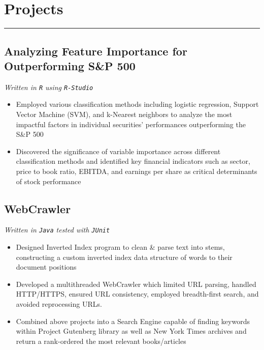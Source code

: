 \documentclass[11pt,a4paper]{article}
\newenvironment{myitemize}
{ \begin{itemize}[label={--}, leftmargin=*]
    \setlength{\itemsep}{0pt}
    \setlength{\parskip}{0pt}
    \setlength{\parsep}{0pt}     }
{ \end{itemize}                  }
\begin{document}
\section*{Projects}
\vspace{-3mm} %
\hrule
\vspace{3mm} %

\subsection*{Analyzing Feature Importance for Outperforming S\&P 500 \hfill {} }
\vspace{-1.5mm} %
\textit{Written in \texttt{R} using \texttt{R-Studio}}
\vspace{-1.5mm} %
\begin{myitemize}
\item Employed various classification methods including logistic regression, Support Vector Machine (SVM), and k-Nearest neighbors to analyze the most impactful factors in individual securities' performances outperforming the S\&P 500
\item Discovered the significance of variable importance across different classification methods and identified key financial indicators such as sector, price to book ratio, EBITDA, and earnings per share as critical determinants of stock performance
\end{myitemize}

\subsection*{WebCrawler \hfill {} }
\vspace{-1.5mm} %
\textit{Written in \texttt{Java} tested with \texttt{JUnit}}
\vspace{-1.5mm} %
\begin{myitemize}
\item Designed Inverted Index program to clean \& parse text into stems, constructing a custom inverted index data structure of words to their document positions
\item Developed a multithreaded WebCrawler which limited URL parsing, handled HTTP/HTTPS, ensured URL consistency, employed breadth-first search, and avoided reprocessing URLs. 
\item Combined above projects into a Search Engine capable of finding keywords within Project Gutenberg library as well as New York Times archives and return a rank-ordered the most relevant books/articles
\end{myitemize}
\end{document}
